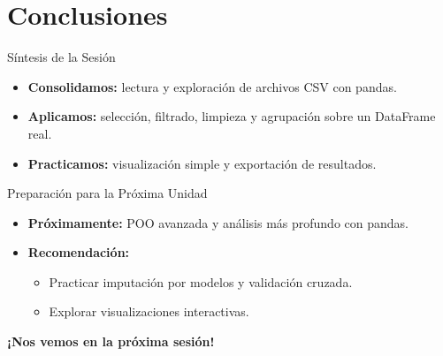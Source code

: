 \documentclass[10pt]{beamer}
\begin{document}
\section{Conclusiones}

\begin{frame}{Síntesis de la Sesión}
  \begin{itemize}
    \item \textbf{Consolidamos:} lectura y exploración de archivos CSV con pandas.
    \item \textbf{Aplicamos:} selección, filtrado, limpieza y agrupación sobre un DataFrame real.
    \item \textbf{Practicamos:} visualización simple y exportación de resultados.
  \end{itemize}
\end{frame}

\begin{frame}{Preparación para la Próxima Unidad}
  \begin{itemize}
    \item \textbf{Próximamente:} POO avanzada y análisis más profundo con pandas.
    \item \textbf{Recomendación:}
      \begin{itemize}
        \item Practicar imputación por modelos y validación cruzada.
        \item Explorar visualizaciones interactivas.
      \end{itemize}
  \end{itemize}
  \begin{center}
    \textbf{¡Nos vemos en la próxima sesión!}
  \end{center}
\end{frame}
\end{document}
